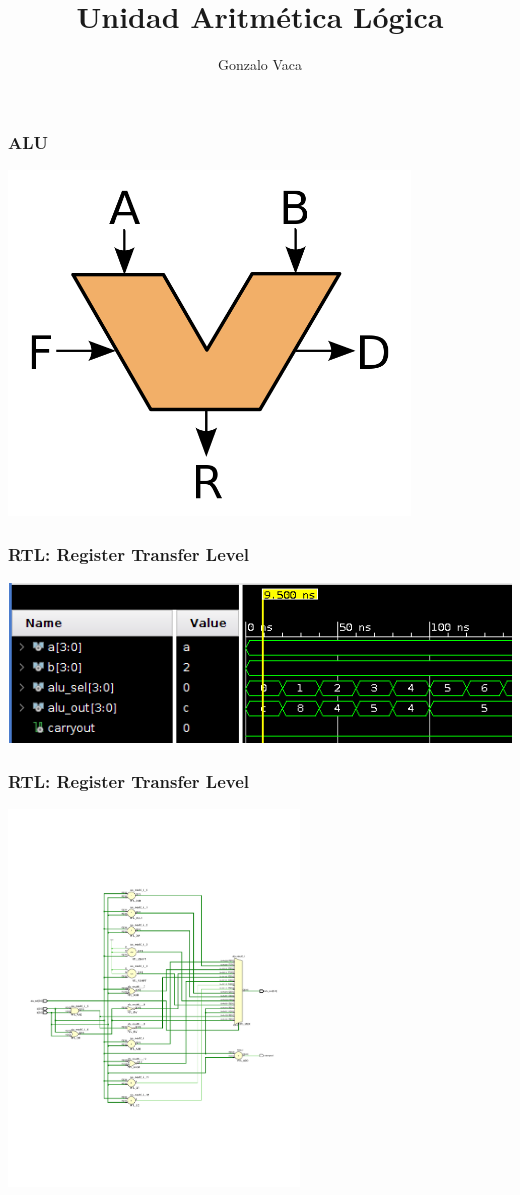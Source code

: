 \documentclass[spanish]{beamer}
\title{Unidad Aritmética Lógica}
\author{Gonzalo Vaca}
\begin{document}
\maketitle

\begin{frame}
    \frametitle{ALU}
    \centering
    \includegraphics[width=0.8\textwidth]{img/alu_example.png}
\end{frame}

\begin{frame}
    \frametitle{RTL: Register Transfer Level}
    \centering
    \includegraphics[width=\textwidth]{img/rtl_sim.png}
\end{frame}

\begin{frame}
    \frametitle{RTL: Register Transfer Level}
    \centering
    \includegraphics[height=10cm]{img/rtl_schematic.pdf}
\end{frame}
\end{document}

